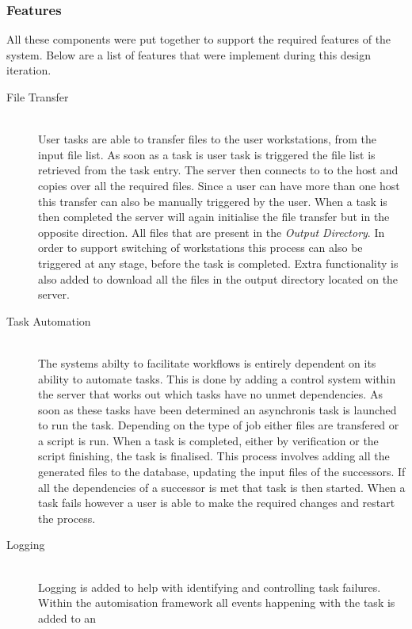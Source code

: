 \documentclass[12pt,a4paper]{report}
\begin{document}
\subsubsection{Features}
All these components were put together to support the required features of the system. Below
are a list of features that were implement during this design iteration.
\begin{description}
    \item[File Transfer] \hfill \\
        User tasks are able to transfer files to the user workstations, from the input
        file list. As soon as a task is user task is triggered the file list is retrieved
        from the task entry. The server then connects to to the host and copies over all
        the required files. Since a user can have more than one host this transfer can also
        be manually triggered by the user. When a task is then completed the server will
        again initialise the file transfer but in the opposite direction. All files that
        are present in the \emph{Output Directory}. In order to support switching of workstations
        this process can also be triggered at any stage, before the task is completed.
        Extra functionality is also added to download all the files in the output directory
        located on the server.
    \item[Task Automation] \hfill \\
        The systems abilty to facilitate workflows is entirely dependent on its ability
        to automate tasks. This is done by adding a control system within the server
        that works out which tasks have no unmet dependencies. As soon as these tasks
        have been determined an asynchronis task is launched to run the task. Depending on
        the type of job either files are transfered or a script is run. When a task is
        completed, either by verification or the script finishing, the task is finalised.
        This process involves adding all the generated files to the database, updating the
        input files of the successors. If all the dependencies of a successor is met that
        task is then started. When a task fails however a user is able to make the required
        changes and restart the process.
    \item[Logging] \hfill \\
        Logging is added to help with identifying and controlling task failures. Within
        the automisation framework all events happening with the task is added to an

\end{description}
\end{document}
